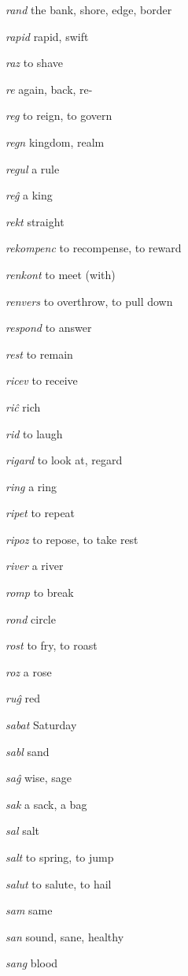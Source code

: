\begin{landscape}
\begin{multicols}{5}
\begin{outdent}{1em}
\emph{rand } the bank, shore, edge, border

\emph{rapid } rapid, swift

\emph{raz } to shave

\emph{re  }again, back, re-

\emph{reg } to reign, to govern

\emph{regn } kingdom, realm

\emph{regul}  a rule

\emph{reĝ } a king

\emph{rekt } straight

\emph{rekompenc}  to recompense, to reward

\emph{renkont}  to meet (with)

\emph{renvers } to overthrow, to pull down

\emph{respond}  to answer

\emph{rest}  to remain

\emph{ricev}  to receive

\emph{riĉ}  rich

\emph{rid}  to laugh

\emph{rigard}  to look at, regard

\emph{ring}  a ring

\emph{ripet } to repeat

\emph{ripoz}  to repose, to take rest

\emph{river } a river

\emph{romp}  to break

\emph{rond}  circle

\emph{rost}  to fry, to roast

\emph{roz}  a rose

\emph{ruĝ}  red
\end{outdent}


\begin{outdent}{1em}
\emph{sabat}  Saturday

\emph{sabl}  sand

\emph{saĝ}  wise, sage

\emph{sak}  a sack, a bag

\emph{sal } salt

\emph{salt}  to spring, to jump

\emph{salut } to salute, to hail 

\emph{sam}  same

\emph{san} sound, sane, healthy

\emph{sang}  blood


\end{outdent}
\end{multicols}
\end{landscape}
